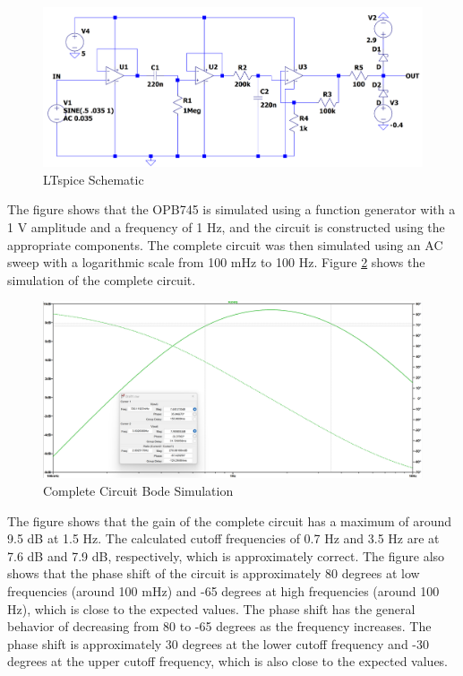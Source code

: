 \documentclass[CMPE]{KGCOEReport}
\begin{document}
\begin{figure}[H]
    \centering
    \includegraphics[width=1\textwidth]{LTspiceSchematic.png}
    \caption{LTspice Schematic}
    \label{fig:ltspiceSchematic}
\end{figure}

The figure shows that the OPB745 is simulated using a function generator with a 1 V amplitude and a frequency of 1 Hz, and the circuit is constructed using the appropriate components. The complete circuit was then simulated using an AC sweep with a logarithmic scale from 100 mHz to 100 Hz. Figure \ref{fig:completeSim} shows the simulation of the complete circuit.

\begin{figure}[H]
    \centering
    \includegraphics[width=1\textwidth]{SimFreqOutputValues.png}
    \caption{Complete Circuit Bode Simulation}
    \label{fig:completeSim}
\end{figure}

The figure shows that the gain of the complete circuit has a maximum of around 9.5 dB at 1.5 Hz. The calculated cutoff frequencies of 0.7 Hz and 3.5 Hz are at 7.6 dB and 7.9 dB, respectively, which is approximately correct. The figure also shows that the phase shift of the circuit is approximately 80 degrees at low frequencies (around 100 mHz) and -65 degrees at high frequencies (around 100 Hz), which is close to the expected values. The phase shift has the general behavior of decreasing from 80 to -65 degrees as the frequency increases. The phase shift is approximately 30 degrees at the lower cutoff frequency and -30 degrees at the upper cutoff frequency, which is also close to the expected values.
\end{document}
